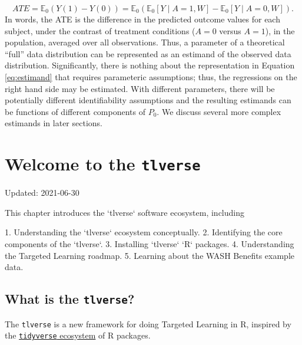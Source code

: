 \documentclass[12pt, krantz2,]{krantz}
\newcommand{\passthrough}[1]{#1}
\theoremstyle{definition}
\theoremstyle{definition}
\theoremstyle{definition}
\newcommand{\E}{\mathbb{E}}
\newcommand{\1}{\mathbbm{1}}
\begin{document}
\begin{equation}
  ATE = \E_0(Y(1) - Y(0)) = \E_0
    \left(\E_0[Y \mid A = 1, W] - \E_0[Y \mid A = 0, W]\right).
  \label{eq:estimand}
\end{equation}
In words, the ATE is the difference in the predicted outcome values for each
subject, under the contrast of treatment conditions (\(A = 0\) versus \(A = 1\)),
in the population, averaged over all observations. Thus, a parameter of a
theoretical ``full'' data distribution can be represented as an estimand of the
observed data distribution. Significantly, there is nothing about the
representation in Equation \eqref{eq:estimand} that requires parameteric
assumptions; thus, the regressions on the right hand side may be estimated.
With different parameters, there will be potentially different identifiability
assumptions and the resulting estimands can be functions of different components
of \(P_0\). We discuss several more complex estimands in later sections.

\hypertarget{tlverse}{%
\chapter{\texorpdfstring{Welcome to the \texttt{tlverse}}{Welcome to the tlverse}}\label{tlverse}}

Updated: 2021-06-30

\begin{VT1}



This chapter introduces the `tlverse` software ecosystem, including

1. Understanding the `tlverse` ecosystem conceptually.
2. Identifying the core components of the `tlverse`.
3. Installing `tlverse` `R` packages.
4. Understanding the Targeted Learning roadmap.
5. Learning about the WASH Benefits example data.

\end{VT1}

\hypertarget{what-is-the-tlverse}{%
\section*{\texorpdfstring{What is the \texttt{tlverse}?}{What is the tlverse?}}\label{what-is-the-tlverse}}


The \passthrough{\lstinline!tlverse!} is a new framework for doing Targeted Learning in R, inspired by
the \href{https://tidyverse.org}{\passthrough{\lstinline!tidyverse!} ecosystem} of R packages.
\end{document}
